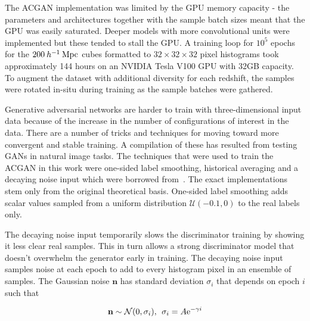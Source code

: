 \documentclass[twocolumn]{article}
\numberwithin{equation}{section}
\begin{document}
The ACGAN implementation was limited by the GPU memory capacity - the parameters and architectures together with the 
sample batch sizes meant that the GPU was easily saturated. Deeper models with more convolutional units were implemented 
but these tended to stall the GPU. A training loop for $10^5$ epochs for the $200 \: h^{-1} \: \textup{Mpc}$ cubes 
formatted to $32 \times 32 \times 32$ pixel histograms took approximately 144 hours on an NVIDIA Tesla V100 GPU with 
32GB capacity. To augment the dataset with additional diversity for each redshift, the samples were rotated in-situ during 
training as the sample batches were gathered. 

Generative adversarial networks are harder to train with three-dimensional input data because of the increase in the 
number of configurations of interest in the data. There are a number of tricks and techniques for moving toward more 
convergent and stable training. A compilation of these has resulted from testing GANs in natural image tasks. The techniques
that were used to train the ACGAN in this work were one-sided label smoothing, historical averaging and a decaying noise 
input which were borrowed from~\cite{gantricks_sali, gan_noise_decay}. The exact implementations stem only from the 
original theoretical basis. One-sided label smoothing adds scalar values sampled from a uniform distribution $\mathcal{U}
(-0.1,0)$ to the real labels only. 


The decaying noise input temporarily slows the discriminator training
by showing it less clear real samples. This in turn allows a strong discriminator model that doesn't overwhelm the generator
early in training. The decaying noise input samples noise at each epoch to add to every histogram pixel in an ensemble of
samples. The Gaussian noise $\mathbf{n}$ has standard deviation $\sigma_i$ that depends on epoch $i$ such that 

\begin{equation}
    \mathbf{n} \sim \mathcal{N}(0,\sigma_i), \: \: \sigma_i = A \textup{e}^{-\gamma i}
\end{equation}
\end{document}
